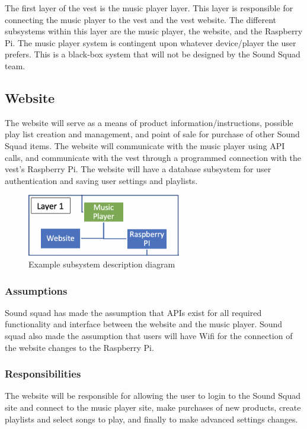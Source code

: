 The first layer of the vest is the music player layer. This layer is responsible for connecting the music player to the vest and the vest website. The different subsystems within this layer are the music player, the website, and the Raspberry Pi. The music player system is contingent upon whatever device/player the user prefers. This is a black-box system that will not be designed by the Sound Squad team.

\subsection{Website}
The website will serve as a means of product information/instructions, possible play list creation and management, and point of sale for purchase of other Sound Squad items. The website will communicate with the music player using API calls, and communicate with the vest through a programmed connection with the vest's Raspberry Pi. The website will have a database subsystem for user authentication and saving user settings and playlists.

\begin{figure}[h!]
	\centering
 	\includegraphics[width=0.60\textwidth]{images/subsystem1}
 \caption{Example subsystem description diagram}
\end{figure}

\subsubsection{Assumptions}
Sound squad has made the assumption that APIs exist for all required functionality and interface between the website and the music player. Sound squad also made the assumption that users will have Wifi for the connection of the website changes to the Raspberry Pi.

\subsubsection{Responsibilities}
The website will be responsible for allowing the user to login to the Sound Squad site and connect to the music player site, make purchases of new products, create playlists and select songs to play, and finally to make advanced settings changes.

